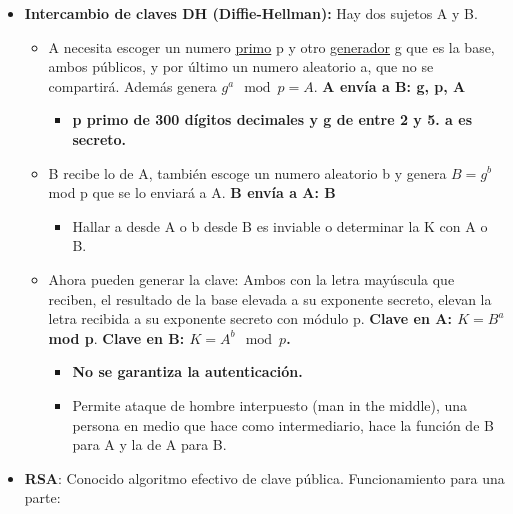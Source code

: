 \documentclass[12pt, twoside, openright]{report} %
\begin{document}
\begin{itemize}
\begin{itemize}
    \item \textbf{Intercambio de claves DH (Diffie-Hellman):} Hay dos
      sujetos A y B.
      

      \begin{itemize}
      \item A necesita escoger un numero \underline{primo} p y otro
        \underline{generador} g que es la base, ambos públicos, y por
        último un numero aleatorio a, que no se compartirá. Además
        genera $g^a \mod p=A$. \textbf{A envía a B: g, p, A}
        

        \begin{itemize}
        \item \textbf{p primo de 300 dígitos decimales y g de entre 2 y 5. a
          es secreto.}
          
        \end{itemize}
      \item B recibe lo de A, también escoge un numero aleatorio b y genera
        $B=g^b$ mod p que se lo enviará a A. \textbf{B envía a A: B}
        

        \begin{itemize}
        \item Hallar a desde A o b desde B es inviable o determinar la K con
          A o B.
          
        \end{itemize}
      \item Ahora pueden generar la clave: Ambos con la letra mayúscula que
        reciben, el resultado de la base elevada a su exponente secreto,
        elevan la letra recibida a su exponente secreto con módulo p.
        \textbf{Clave en A: $K=B^a$ mod p}. \textbf{Clave en B: $K= A^b \mod
        p$.}
        

        \begin{itemize}
        \item \textbf{No se garantiza la autenticación.}
          
        \item Permite ataque de hombre interpuesto (man in the middle), una
          persona en medio que hace como intermediario, hace la función
          de B para A y la de A para B.
          
        \end{itemize}
      \end{itemize}
    \item \textbf{RSA}: Conocido algoritmo efectivo de clave pública.
      Funcionamiento para una parte:
      


\end{itemize}
\end{itemize}
\end{document}
